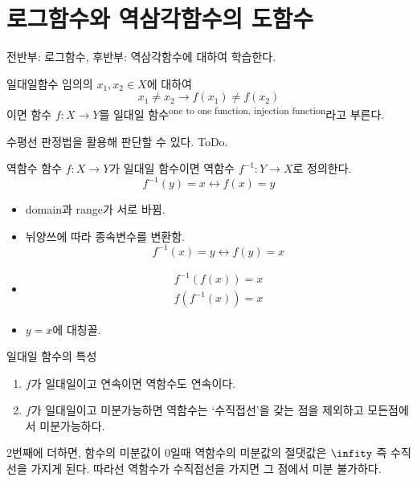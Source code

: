 \documentclass[../note.tex]{subfiles}
\begin{document}
\section{로그함수와 역삼각함수의 도함수}
전반부: 로그함수, 후반부: 역삼각함수에 대하여 학습한다.

\begin{definition}{일대일함수}
  임의의 $x_1, x_2 \in X$에 대하여
  \begin{equation}
    x_1 \neq x_2 \rightarrow f(x_1) \neq f(x_2)
  \end{equation}
  이면 함수 $f: X \rightarrow Y$를 일대일 함수\textsuperscript{one to one function, injection function}라고 부른다.
\end{definition}
수평선 판정법을 활용해 판단할 수 있다. ToDo.

\begin{definition}{역함수}
  함수 $f: X\rightarrow Y$가 일대일 함수이면 역함수 $f^{-1}: Y\rightarrow X$로 정의한다.
  \begin{equation}
    f^{-1}(y) = x \leftrightarrow f(x) = y
  \end{equation}
\end{definition}

\begin{remark}
  \begin{itemize}
    \item
      domain과 range가 서로 바뀜.
    \item
      뉘양쓰에 따라 종속변수를 변환함.
      \begin{equation}
        f^{-1}(x)=y \leftrightarrow f(y)=x
      \end{equation}
    \item
      \begin{align}
        f^{-1}(f(x)) = x \\
        f(f^{-1}(x)) = x
      \end{align}
    \item
      $y=x$에 대칭꼴.
  \end{itemize}
\end{remark}

\begin{remark}
  일대일 함수의 특성
  \begin{enumerate}
    \item
      $f$가 일대일이고  연속이면 역함수도 연속이다.
    \item
      $f$가 일대일이고 미분가능하면 역함수는 `수직접선'을 갖는 점을 제외하고 모든점에서 미분가능하다. 
  \end{enumerate}
\end{remark}
2번째에 더하면, 함수의 미분값이 0일때 역함수의 미분값의 절댓값은 $\infity$ 즉 수직선을 가지게 된다. 따라선 역함수가 수직접선을 가지면 그 점에서 미분 불가하다.
\end{document}

